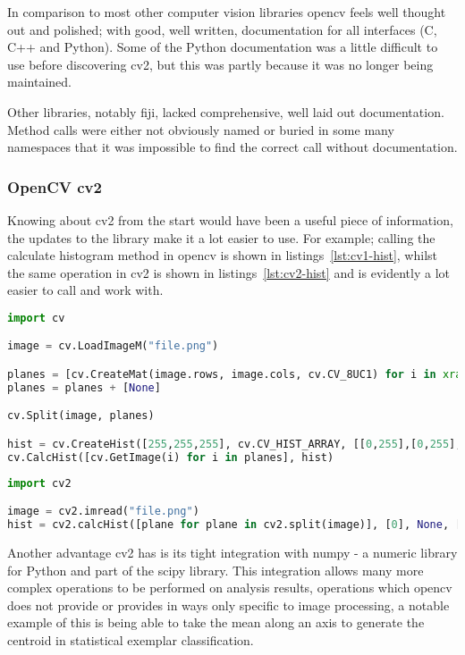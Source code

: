 In comparison to most other computer vision libraries \gls{opencv} feels well thought out and 
polished; with good, well written, documentation for all interfaces (C, C++ and Python). Some of
the Python documentation was a little difficult to use before discovering \gls{cv2}, but this was 
partly because it was no longer being maintained.

Other libraries, notably \gls{fiji}, lacked comprehensive, well laid out documentation. Method 
calls were either not obviously named or buried in some many namespaces that it was impossible to
find the correct call without documentation.


\subsubsection{OpenCV cv2}
Knowing about \gls{cv2} from the start would have been a useful piece of information, the
updates to the library make it a lot easier to use. For example; calling the calculate histogram
method in \gls{opencv} is shown in listings~\ref{lst:cv1-hist}, whilst the same operation in 
\gls{cv2} is shown in listings~\ref{lst:cv2-hist} and is evidently a lot easier to call
and work with.



\begin{lstlisting}[language=python, caption={Creating a Histogram in OpenCV}, label=lst:cv1-hist, 
breaklines=true, frame=single]
import cv

image = cv.LoadImageM("file.png")

planes = [cv.CreateMat(image.rows, image.cols, cv.CV_8UC1) for i in xrange(3)]
planes = planes + [None]

cv.Split(image, planes)

hist = cv.CreateHist([255,255,255], cv.CV_HIST_ARRAY, [[0,255],[0,255],[0,255]], 1)
cv.CalcHist([cv.GetImage(i) for i in planes], hist)
\end{lstlisting}


\begin{lstlisting}[language=python, caption={Creating a Histogram in OpenCV cv2},
label=lst:cv2-hist, breaklines=true, frame=single]
import cv2

image = cv2.imread("file.png")
hist = cv2.calcHist([plane for plane in cv2.split(image)], [0], None, [255,255,255], [0,255,0,255,0,255])
\end{lstlisting}

Another advantage \gls{cv2} has is its tight integration with numpy - a numeric library for Python
and part of the scipy library. This integration allows many more complex operations to be 
performed on analysis results, operations which \gls{opencv} does not provide or provides in ways
only specific to image processing, a notable example of this is being able to take the mean along
an axis to generate the centroid in statistical exemplar classification.


